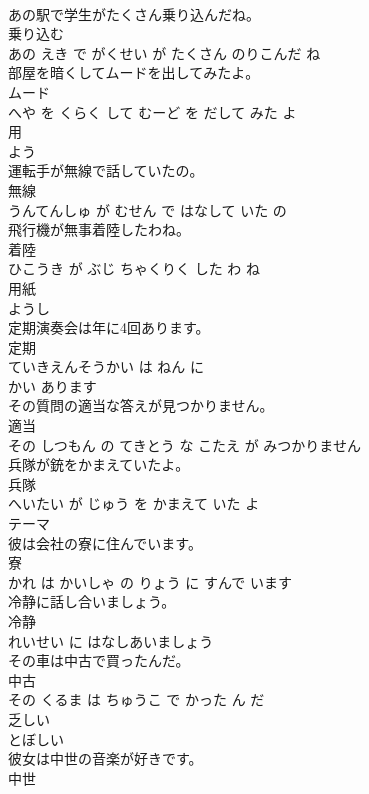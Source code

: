 \documentclass[8pt]{extreport}
\begin{document}
\begin{CJK}{UTF8}{min}
\\	あの駅で学生がたくさん乗り込んだね。	
\\	乗り込む 
\\	あの えき で がくせい が たくさん のりこんだ ね			
\\	部屋を暗くしてムードを出してみたよ。	
\\	ムード 
\\	へや を くらく して むーど を だして みた よ			
\\	用	
\\	よう		
\\	運転手が無線で話していたの。	
\\	無線 
\\	うんてんしゅ が むせん で はなして いた の			
\\	飛行機が無事着陸したわね。	
\\	着陸 
\\	ひこうき が ぶじ ちゃくりく した わ ね			
\\	用紙	
\\	ようし		
\\	定期演奏会は年に4回あります。	
\\	定期 
\\	ていきえんそうかい は ねん に 
\\	かい あります			
\\	その質問の適当な答えが見つかりません。	
\\	適当 
\\	その しつもん の てきとう な こたえ が みつかりません			
\\	兵隊が銃をかまえていたよ。	
\\	兵隊 
\\	へいたい が じゅう を かまえて いた よ			
\\	テーマ	
\\	彼は会社の寮に住んでいます。	
\\	寮 
\\	かれ は かいしゃ の りょう に すんで います			
\\	冷静に話し合いましょう。	
\\	冷静 
\\	れいせい に はなしあいましょう			
\\	その車は中古で買ったんだ。	
\\	中古 
\\	その くるま は ちゅうこ で かった ん だ			
\\	乏しい	
\\	とぼしい		
\\	彼女は中世の音楽が好きです。	
\\	中世 

\end{CJK}
\end{document}
